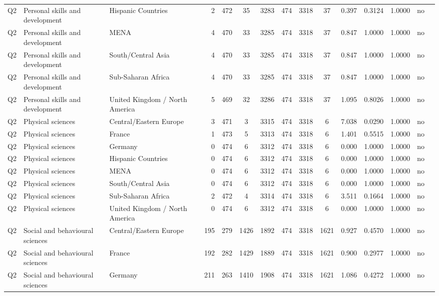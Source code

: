 \begin{longtable}{lllrcccccccccll}
Q2 & Personal skills and development & Hispanic Countries & 2 & 472 & 35 & 3283 & 474 & 3318 & 37 & 0.397 & 0.3124 & 1.0000 & no \\
Q2 & Personal skills and development & MENA & 4 & 470 & 33 & 3285 & 474 & 3318 & 37 & 0.847 & 1.0000 & 1.0000 & no \\
Q2 & Personal skills and development & South/Central Asia & 4 & 470 & 33 & 3285 & 474 & 3318 & 37 & 0.847 & 1.0000 & 1.0000 & no \\
Q2 & Personal skills and development & Sub-Saharan Africa & 4 & 470 & 33 & 3285 & 474 & 3318 & 37 & 0.847 & 1.0000 & 1.0000 & no \\
Q2 & Personal skills and development & United Kingdom / North America & 5 & 469 & 32 & 3286 & 474 & 3318 & 37 & 1.095 & 0.8026 & 1.0000 & no \\
Q2 & Physical sciences & Central/Eastern Europe & 3 & 471 & 3 & 3315 & 474 & 3318 & 6 & 7.038 & 0.0290 & 1.0000 & no \\
Q2 & Physical sciences & France & 1 & 473 & 5 & 3313 & 474 & 3318 & 6 & 1.401 & 0.5515 & 1.0000 & no \\
Q2 & Physical sciences & Germany & 0 & 474 & 6 & 3312 & 474 & 3318 & 6 & 0.000 & 1.0000 & 1.0000 & no \\
Q2 & Physical sciences & Hispanic Countries & 0 & 474 & 6 & 3312 & 474 & 3318 & 6 & 0.000 & 1.0000 & 1.0000 & no \\
Q2 & Physical sciences & MENA & 0 & 474 & 6 & 3312 & 474 & 3318 & 6 & 0.000 & 1.0000 & 1.0000 & no \\
Q2 & Physical sciences & South/Central Asia & 0 & 474 & 6 & 3312 & 474 & 3318 & 6 & 0.000 & 1.0000 & 1.0000 & no \\
Q2 & Physical sciences & Sub-Saharan Africa & 2 & 472 & 4 & 3314 & 474 & 3318 & 6 & 3.511 & 0.1664 & 1.0000 & no \\
Q2 & Physical sciences & United Kingdom / North America & 0 & 474 & 6 & 3312 & 474 & 3318 & 6 & 0.000 & 1.0000 & 1.0000 & no \\
Q2 & Social and behavioural sciences & Central/Eastern Europe & 195 & 279 & 1426 & 1892 & 474 & 3318 & 1621 & 0.927 & 0.4570 & 1.0000 & no \\
Q2 & Social and behavioural sciences & France & 192 & 282 & 1429 & 1889 & 474 & 3318 & 1621 & 0.900 & 0.2977 & 1.0000 & no \\
Q2 & Social and behavioural sciences & Germany & 211 & 263 & 1410 & 1908 & 474 & 3318 & 1621 & 1.086 & 0.4272 & 1.0000 & no \\

\end{longtable}
